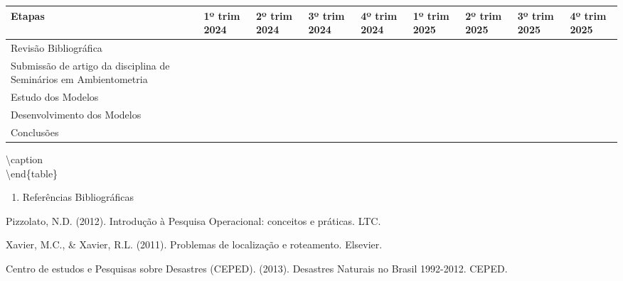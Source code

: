 \documentclass[
]{article}
\providecommand{\tightlist}{%
  \setlength{\itemsep}{0pt}\setlength{\parskip}{0pt}}
\begin{document}
\begin{tabular}{|p{3cm}|p{1.5cm}|p{1.5cm}|p{1.5cm}|p{1.5cm}|p{1.5cm}|p{1.5cm}|p{1.5cm}|p{1.5cm}|}
\hline
Etapas & 1º trim 2024 & 2º trim 2024 & 3º trim 2024 & 4º trim 2024 & 1º trim 2025 & 2º trim 2025 & 3º trim 2025 & 4º trim 2025 \\ \hline
Revisão Bibliográfica   &    &    &    &    &    &    &    &    \\ \hline
Submissão de artigo da
disciplina de Seminários
em Ambientometria   &    &    &    &    &    &    &    &    \\ \hline
Estudo dos Modelos   &    &    &    &    &    &    &    &    \\ \hline
Desenvolvimento dos Modelos &    &    &    &    &    &    &    &    \\ \hline
Conclusões   &    &    &    &    &    &    &    &    \\ \hline
\end{tabular}

\textbackslash caption\\
\textbackslash end\{table\}

\newpage

\begin{enumerate}
\def\labelenumi{\arabic{enumi}.}
\setcounter{enumi}{6}
\tightlist
\item
  Referências Bibliográficas
\end{enumerate}

Pizzolato, N.D. (2012). Introdução à Pesquisa Operacional: conceitos e
práticas. LTC.

Xavier, M.C., \& Xavier, R.L. (2011). Problemas de localização e
roteamento. Elsevier.

Centro de estudos e Pesquisas sobre Desastres (CEPED). (2013). Desastres
Naturais no Brasil 1992-2012. CEPED.
\end{document}
